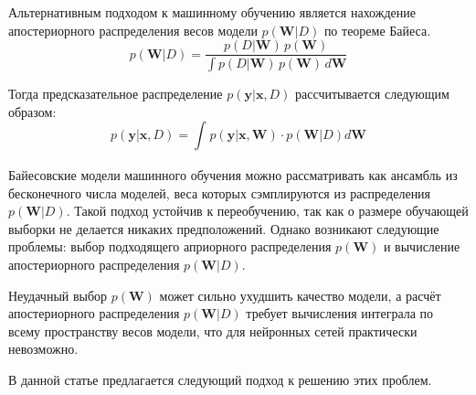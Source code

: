 \documentclass{article}
\begin{document}
Альтернативным подходом к машинному обучению является нахождение апостериорного распределения весов модели $p(\pmb{W}| D)$ по теореме Байеса.
\[
    p(\pmb{W}| D) =
    \frac
        {
            p(D | \pmb{W})
            \,
            p(\pmb{W})
        }
        {
            \int{
                p(D | \pmb{W})
                \,
                p(\pmb{W})
                \,
                d\pmb{W}
            }
        }
\]

Тогда предсказательное распределение $p(\pmb{y} | \pmb{x}, D)$ рассчитывается следующим образом:
\[
    p(\pmb{y} | \pmb{x}, D) =
    \int_{}{} p(\pmb{y} | \pmb{x}, \pmb{W}) \cdot p(\pmb{W} | D) d \pmb{W}
\]


Байесовские модели машинного обучения можно рассматривать как ансамбль из бесконечного числа моделей, веса которых сэмплируются из распределения $p(\pmb{W}| D)$. Такой подход устойчив к переобучению, так как о размере обучающей выборки не делается никаких предположений. Однако возникают следующие проблемы: выбор подходящего априорного распределения $p(\pmb{W})$ и вычисление апостериорного распределения $p(\pmb{W}| D)$.

Неудачный выбор $p(\pmb{W})$ может сильно ухудшить качество модели, а расчёт апостериорного распределения $p(\pmb{W}| D)$ требует вычисления интеграла по всему пространству весов модели, что для нейронных сетей практически невозможно.

В данной статье предлагается следующий подход к решению этих проблем.
\end{document}
